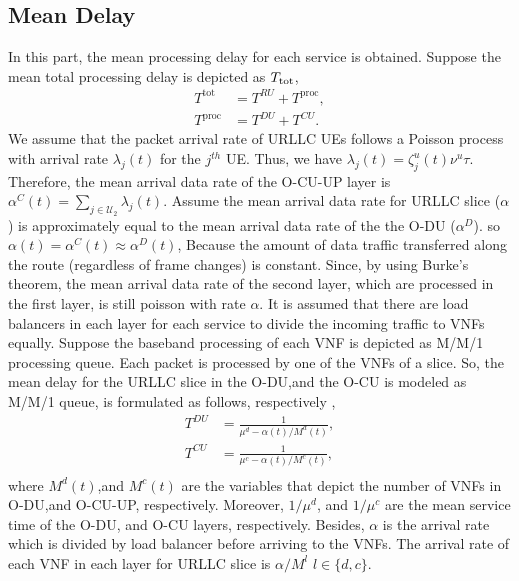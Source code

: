 \documentclass[conference]{IEEEtran}
\begin{document}
\subsection{Mean Delay}
In this part, the mean processing delay for each service is obtained.
Suppose the mean total processing delay is depicted as $T_{\text{\text{tot}}}$,
\begin{subequations} 
\begin{alignat}{4}
T^{\text{tot}} &= T^{RU} + T^{\text{proc}},\\
T^{\text{proc}} &= T^{DU} + T^{CU}.
\end{alignat}
\end{subequations} 
We assume that the packet arrival rate of URLLC UEs follows a Poisson process with arrival rate $\lambda_{j}(t)$ for the $j^{th}$ UE.
Thus, we have $\lambda_j(t) = {\zeta}^u_{j}(t){\nu}^u \tau$.
Therefore, the mean arrival data rate of the O-CU-UP layer is $\alpha^C(t) = \sum_{j\in \mathcal{U}_2}\lambda_{j}(t)$.
Assume the mean arrival data rate for URLLC slice ($\alpha$) is approximately equal to the mean arrival data rate of the  the O-DU ($\alpha^D$). so $\alpha(t) = \alpha^C(t) \approx \alpha^D(t)$,
Because the amount of data traffic transferred along the route (regardless of frame changes) is constant.
Since, by using Burke’s theorem, the mean arrival data rate of the second layer, which are processed in the first layer, is still poisson with rate $\alpha$.
It is assumed that there are load balancers in each layer for each service to divide the incoming traffic to VNFs equally. %
Suppose the baseband processing of each VNF is depicted as M/M/1 processing queue.
Each packet is processed by one of the VNFs of a slice. So, the mean delay for the URLLC slice in the O-DU,and the O-CU is modeled as M/M/1 queue, is formulated as follows, respectively \cite{SystemCostMinimization,luong2018joint,luong2018novel},
\begin{equation}
\begin{split}
T^{DU} &= \frac{1}{\mu^d - \alpha(t)/{M^{d}(t)}},\\
T^{CU} &= \frac{1}{\mu^c - \alpha(t)/{M^{c}}(t)},\\
\end{split}
\end{equation}
where $M^{d}(t)$,and $M^{c}(t)$ are the variables that depict the number of VNFs in O-DU,and O-CU-UP, respectively. 
Moreover, $1/\mu^d$, and $1/\mu^c$ are the mean service time of the O-DU, and O-CU layers, respectively.
Besides, $\alpha$ is the  arrival rate which is divided
by load balancer before arriving to the VNFs. The arrival rate of each VNF in each layer for URLLC slice  is $\alpha/{M^{l}}$ $ l \in \{d,c\}$.
\end{document}

